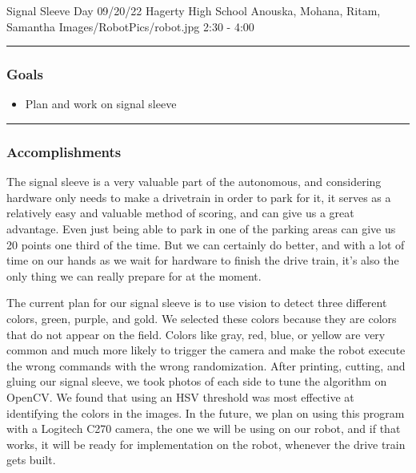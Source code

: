 \insertmeeting 
	{Signal Sleeve Day} 
	{09/20/22}
	{Hagerty High School}
	{Anouska, Mohana, Ritam, Samantha}
	{Images/RobotPics/robot.jpg}
	{2:30 - 4:00}
	
\noindent\hfil\rule{\textwidth}{.4pt}\hfil
\subsubsection*{Goals}
\begin{itemize}
    \item Plan and work on signal sleeve

\end{itemize} 

\noindent\hfil\rule{\textwidth}{.4pt}\hfil

\subsubsection*{Accomplishments}
The signal sleeve is a very valuable part of the autonomous, and considering hardware only needs to make a drivetrain in order to park for it, it serves as a relatively easy and valuable method of scoring, and can give us a great advantage. Even just being able to park in one of the parking areas can give us 20 points one third of the time. But we can certainly do better, and with a lot of time on our hands as we wait for hardware to finish the drive train, it's also the only thing we can really prepare for at the moment.

The current plan for our signal sleeve is to use vision to detect three different colors, green, purple, and gold. We selected these colors because they are colors that do not appear on the field. Colors like gray, red, blue, or yellow are very common and much more likely to trigger the camera and make the robot execute the wrong commands with the wrong randomization. After printing, cutting, and gluing our signal sleeve, we took photos of each side to tune the algorithm on OpenCV. We found that using an HSV threshold was most effective at identifying the colors in the images. In the future, we plan on using this program with a Logitech C270 camera, the one we will be using on our robot, and if that works, it will be ready for implementation on the robot, whenever the drive train gets built.




